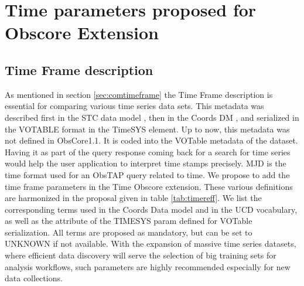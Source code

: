 \documentclass[11pt,a4paper]{ivoa}
\begin{document}
 \section{Time parameters proposed for Obscore Extension }
 \label{sec:timeext}

  \subsection{Time Frame description}
  As mentioned in section \ref{sec:comtimeframe} the Time Frame description is essential for comparing various time series data sets.
This metadata was described first in the STC data model  \citep{2007ivoa.spec.1030R}, then  in the Coords DM \citep{2022ivoa.specQ1004R}, and serialized in the  VOTABLE format in the TimeSYS element.
Up to now, this metadata  was not defined in ObsCore1.1. It is coded into the VOTable  metadata of the dataset.
Having  it as  part of the query response coming back for a search for time series would help the user application to interpret time stamps precisely.
MJD is the time format used for an ObsTAP query related to time.
We propose to add the time frame parameters in the Time Obscore extension.
These various definitions are harmonized in the proposal given in  table \ref{tab:timereff}. We list the corresponding terms used in the Coords Data model and in the UCD vocabulary, as well as the attribute of the TIMESYS param defined for VOTable serialization.
All terms are proposed as mandatory, but can be set to UNKNOWN if not available.
With the expansion of massive time series datasets, where efficient data discovery will serve the selection of big training sets for analysis workflows,
such parameters are highly recommended especially for new data collections.
\end{document}
